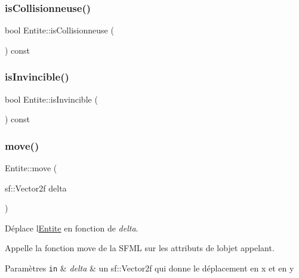 \mbox{\label{class_entite_af18791ba27e747f426db1125bf77aeff}} 
\subsubsection{\texorpdfstring{is\+Collisionneuse()}{isCollisionneuse()}}
{\footnotesize\ttfamily bool Entite\+::is\+Collisionneuse (\begin{DoxyParamCaption}{ }\end{DoxyParamCaption}) const\hspace{0.3cm}{\ttfamily [inline]}}

\mbox{\label{class_entite_a3905c5bfe2890fd5da1f7ea704c277ac}} 
\subsubsection{\texorpdfstring{is\+Invincible()}{isInvincible()}}
{\footnotesize\ttfamily bool Entite\+::is\+Invincible (\begin{DoxyParamCaption}{ }\end{DoxyParamCaption}) const\hspace{0.3cm}{\ttfamily [inline]}}

\mbox{\label{class_entite_a0e682335d5ae1518970a30eb07d8e6d1}} 
\subsubsection{\texorpdfstring{move()}{move()}}
{\footnotesize\ttfamily Entite\+::move (\begin{DoxyParamCaption}\item[{sf\+::\+Vector2f}]{delta }\end{DoxyParamCaption})}



Déplace l\textquotesingle{}\hyperlink{class_entite}{Entite} en fonction de {\itshape delta}. 

Appelle la fonction move de la S\+F\+ML sur les attributs de l\textquotesingle{}objet appelant. 
\begin{DoxyParams}[1]{Paramètres}
\mbox{\tt in}  & {\em delta} & un {\ttfamily sf\+::\+Vector2f} qui donne le déplacement en x et en y \\
\hline
\end{DoxyParams}
\mbox{\label{class_entite_ab16c58f618b3b854310f92f044cc4a17}} 
